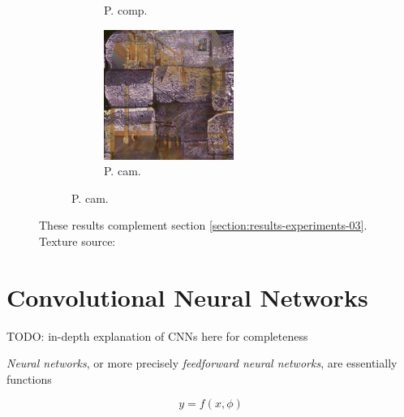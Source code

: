 \begin{figure}[]
\begin{subfigure}{\textwidth}
\begin{subfigure}{0.19\textwidth}
            \caption*{P. comp.}
        \end{subfigure}
        \hfill
        \begin{subfigure}{0.19\textwidth}
            \centering
            \includegraphics[width=\textwidth]{images/04-experiment03/staircase_illum/beams/pixel_proj.jpg}
            \caption*{P. cam.}
        \end{subfigure}
    \end{subfigure}
    \caption{These results complement section \ref{section:results-experiments-03}. Texture source: \citet{Pixar128}}
    \label{fig:ex03-complete-staircase_illum}
\end{figure}

\chapter{Convolutional Neural Networks}
\label{chapter:appendix-cnns}

{\color{red} TODO: in-depth explanation of CNNs here for completeness}

\textit{Neural networks}, or more precisely \textit{feedforward neural networks}, are essentially functions

\begin{equation}
    \label{eq:neural_network}
    y = f(x, \phi)
\end{equation}

